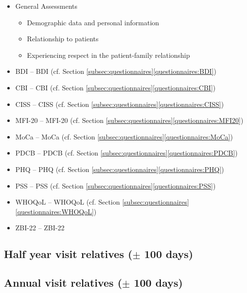 \begin{itemize}[noitemsep,topsep=0pt]
\item General Assessments
\begin{itemize}[noitemsep,topsep=0pt]
\item Demographic data and personal information
\item Relationship to patients
\item Experiencing respect in the patient-family relationship %
\end{itemize}
\item \acl{BDI} -- \acs{BDI} (cf. Section \ref{subsec:questionnaires}\ref{questionnaires:BDI})
\item \acl{CBI} -- \acs{CBI} (cf. Section \ref{subsec:questionnaires}\ref{questionnaires:CBI})
\item \acl{CISS} -- \acs{CISS} (cf. Section \ref{subsec:questionnaires}\ref{questionnaires:CISS})
\item \acl{MFI-20} -- \acs{MFI-20} (cf. Section \ref{subsec:questionnaires}\ref{questionnaires:MFI20})
\item \acl{MoCa} -- \acs{MoCa} (cf. Section \ref{subsec:questionnaires}\ref{questionnaires:MoCa})
\item \acl{PDCB} -- \acs{PDCB} (cf. Section \ref{subsec:questionnaires}\ref{questionnaires:PDCB})
\item \acl{PHQ} -- \acs{PHQ} (cf. Section \ref{subsec:questionnaires}\ref{questionnaires:PHQ})
\item \acl{PSS} -- \acs{PSS} (cf. Section \ref{subsec:questionnaires}\ref{questionnaires:PSS})
\item \acl{WHOQoL} -- \acs{WHOQoL} (cf. Section \ref{subsec:questionnaires}\ref{questionnaires:WHOQoL})
\item \acl{ZBI-22} -- \acs{ZBI-22}
\end{itemize}

\subsection{Half year visit relatives ($\pm$ 100 days)}

\subsection{Annual visit relatives ($\pm$ 100 days)}


